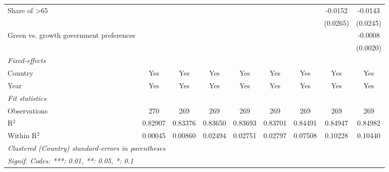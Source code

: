 \begin{table}[htbp]
\begin{tabular}{lcccccccc}
      Share of >65                              &          &          &          &          &          &          & -0.0152  & -0.0143\\   
                                                &          &          &          &          &          &          & (0.0265) & (0.0245)\\   
      Green vs. growth government preferences   &          &          &          &          &          &          &          & -0.0008\\   
                                                &          &          &          &          &          &          &          & (0.0020)\\   
      \midrule
      \emph{Fixed-effects}\\
      Country                                   & Yes      & Yes      & Yes      & Yes      & Yes      & Yes      & Yes      & Yes\\  
      Year                                      & Yes      & Yes      & Yes      & Yes      & Yes      & Yes      & Yes      & Yes\\  
      \midrule
      \emph{Fit statistics}\\
      Observations                              & 270      & 269      & 269      & 269      & 269      & 269      & 269      & 269\\  
      R$^2$                                     & 0.82907  & 0.83376  & 0.83650  & 0.83693  & 0.83701  & 0.84491  & 0.84947  & 0.84982\\  
      Within R$^2$                              & 0.00045  & 0.00860  & 0.02494  & 0.02751  & 0.02797  & 0.07508  & 0.10228  & 0.10440\\  
      \midrule \midrule
      \multicolumn{9}{l}{\emph{Clustered (Country) standard-errors in parentheses}}\\
      \multicolumn{9}{l}{\emph{Signif. Codes: ***: 0.01, **: 0.05, *: 0.1}}\\
   \end{tabular}
\end{table}



